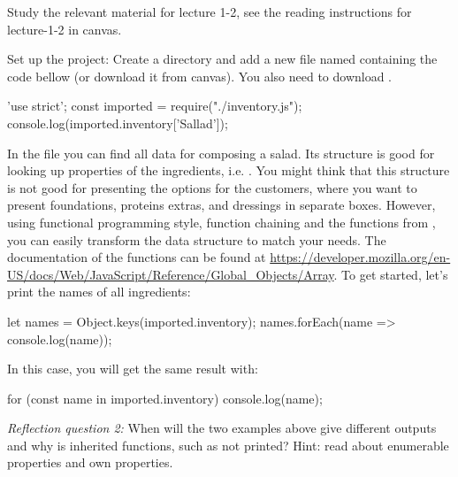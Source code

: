 \documentclass[fleqn, article, a4paper]{memoir}
\begin{document}
\begin{Assignments}

\item Study the relevant material for lecture 1-2, see the reading instructions for lecture-1-2 in canvas. 


\item %
Set up the project: Create a directory and add a new file named  containing the code bellow (or download it from canvas). You also need to download .
\begin{Code}
'use strict';
const imported = require("./inventory.js");
console.log(imported.inventory['Sallad']);
\end{Code}



\item In the  file you can find all data for composing a salad. Its structure is good for looking up properties of the ingredients, i.e. . You might think that this structure is not good for presenting the options for the customers, where you want to present foundations, proteins extras, and dressings in separate boxes. However, using functional programming style, function chaining and the functions from , you can easily transform the data structure to match your needs. The documentation of the functions can be found at \url{https://developer.mozilla.org/en-US/docs/Web/JavaScript/Reference/Global_Objects/Array}. To get started, let's print the names of all ingredients:
\begin{Code}
let names = Object.keys(imported.inventory);
names.forEach(name => console.log(name));
\end{Code}
In this case, you will get the same result with:
\begin{Code}
for (const name in imported.inventory) {
  console.log(name);
}
\end{Code}
\emph{Reflection question 2:} When will the two examples above give different outputs and why is inherited functions, such as  not printed? Hint: read about enumerable properties and own properties.


\end{Assignments}
\end{document}
